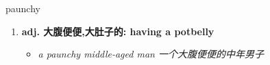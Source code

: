 
\begin{frame}
{\huge paunchy}
\begin{center}
\begin{enumerate}\Large
  \item \textbf{adj. 大腹便便,大肚子的: having a potbelly}
  \begin{itemize}
    \item \em{\Large{a paunchy middle-aged man 一个大腹便便的中年男子}}
  \end{itemize}
\end{enumerate}
\end{center}
\end{frame}
